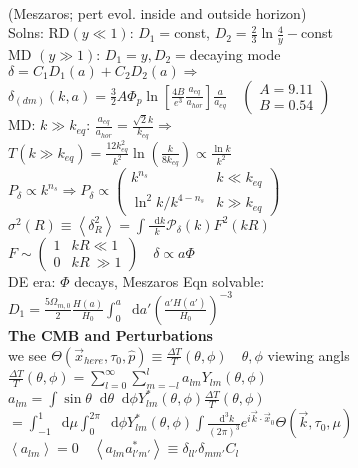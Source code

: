 \documentclass[12pt]{article}
\newcommand*\diff{\mathop{}\!\mathrm{d}}
\begin{document}
{	\\(Meszaros; pert evol. inside and outside horizon)
	\\Solns: RD$(y\ll 1)$: $D_1=$const, $D_2=\frac{2}{3}\ln\frac{4}{y} -$const
	\\MD $(y\gg 1)$: $D_1=y, D_2=$decaying mode
	\\$\delta = C_1D_1(a)+C_2D_2(a) \Rightarrow$
	\\$\delta_{(dm)}(k,a)=\frac{3}{2}A\Phi_p\ln\left[\frac{4B}{e^3}\frac{a_{eq}}{a_{hor}}\right]\frac{a}{a_{eq}} \quad \begin{pmatrix}A=9.11 \\B=0.54\end{pmatrix}$
	\\MD: $k\gg k_{eq}$: $\frac{a_{eq}}{a_{hor}}=\frac{\sqrt{2}k}{k_{eq}}\Rightarrow $
	\\$T(k\gg k_{eq})=\frac{12k_{eq}^2}{k^2}\ln\left(\frac{k}{8k_{eq}}\right)\propto\frac{\ln k}{k^2}$
	\\$P_\delta\propto k^{n_s}\Rightarrow P_\delta\propto\begin{pmatrix}k^{n_s} & k\ll k_{eq}\\\ln^2k/k^{4-n_s}& k\gg k_{eq}\end{pmatrix}$
	\\$\sigma^2(R)\equiv\left<\delta_R^2\right>=\int\frac{\diff k}{k}\mathcal{P}_\delta(k)F^2(kR)$
	\\$F\sim\begin{pmatrix}1 & kR\ll 1 \\ 0 & kR\ \gg 1\end{pmatrix} \quad \delta\propto a\Phi \quad$ 
	\\DE era: $\Phi$ decays, Meszaros Eqn solvable:
	\\$D_1=\frac{5\Omega_{m,0}}{2}\frac{H(a)}{H_0}\int_0^a\diff a' \left(\frac{a'H(a')}{H_0}\right)^{-3}$
	\\\textbf{The CMB and Perturbations}
	\\we see $\Theta(\vec{x}_{here},\tau_0,\hat{p})\equiv\frac{\Delta T}{T}(\theta,\phi) \quad \theta,\phi$ viewing angls
	\\$\frac{\Delta T}{T}(\theta,\phi)=\sum_{l=0}^\infty\sum_{m=-l}^la_{lm}Y_{lm}(\theta,\phi)$
	\\$a_{lm}=\int\sin\theta\diff\theta\diff\phi Y^*_{lm}(\theta,\phi)\frac{\Delta T}{T}(\theta,\phi)$
	\\$=\int_{-1}^1\diff\mu\int_0^{2\pi}\diff\phi Y^*_{lm}(\theta,\phi)\int\frac{\diff^3 k}{(2\pi)^3}e^{i\vec{k}\cdot\vec{x}_0}\Theta(\vec{k},\tau_0,\mu)$
	\\$\left<a_{lm}\right>=0 \quad \left<a_{lm}a^*_{l'm'}\right>\equiv\delta_{ll'}\delta_{mm'}C_l$
}
\end{document}
